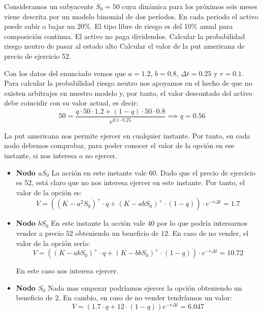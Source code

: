 \begin{problem}[2]
Consideramos un subyacente $S_0=50$ cuya dinámica para los próximos seis meses viene descrita por un modelo binomial de dos períodos. En cada periodo el activo puede subir o bajar un 20\%. El tipo libre de riesgo es del 10\% anual para composición continua. El activo no paga dividendos.
\ppart Calcular la probabilidad riesgo neutro de pasar al estado alto
\ppart Calcular el valor de la put americana de precio de ejercicio 52.

\solution
{}

\spart

Con los datos del enunciado vemos que $a=1.2$, $b=0.8$, $Δt=0.25$ y $r=0.1$. Para calcular la probabilidad riesgo neutro nos apoyamos en el hecho de que no existen arbitrajes en nuestro modelo y, por tanto, el valor descontado del activo debe coincidir con su valor actual, es decir:
\[50 = \frac{q\cdot 50 \cdot 1.2 + (1-q)\cdot 50 \cdot 0.8}{e^{0.1\cdot 0.25}} \implies q=0.56\]

\spart

La put americana nos permite ejercer en cualquier instante. Por tanto, en cada nodo debemos comprobar, para poder conocer el valor de la opción en ese instante, si nos interesa o no ejercer.

\begin{itemize}
\item \textbf{Nodo $aS_0$}
La acción en este instante vale $60$. Dado que el precio de ejercicio es 52, está claro que no nos interesa ejercer en este instante. Por tanto, el valor de la opción es:
\[V = \left((K-a^2S_0)^+\cdot q + (K-abS_0)^+\cdot (1-q)\right)\cdot e^{-rΔt} = 1.7\]

\item \textbf{Nodo $bS_0$}
En este instante la acción vale $40$ por lo que podría intersarnos vender a precio $52$ obteniendo un beneficio de $12$. En caso de no vender, el valor de la opción sería:
\[V = \left((K-abS_0)^+\cdot q + (K-bbS_0)^+\cdot (1-q)\right)\cdot e^{-rΔt} = 10.72\]

En este caso nos interesa ejercer.

\item \textbf{Nodo $S_0$}
Nada mas empezar podríamos ejercer la opción obteniendo un beneficio de $2$. En cambio, en caso de no vender tendríamos un valor:
\[V = \left(1.7\cdot q + 12 \cdot (1-q)\right)e^{-rΔt} = 6.047\]
\end{itemize}
\end{problem}

